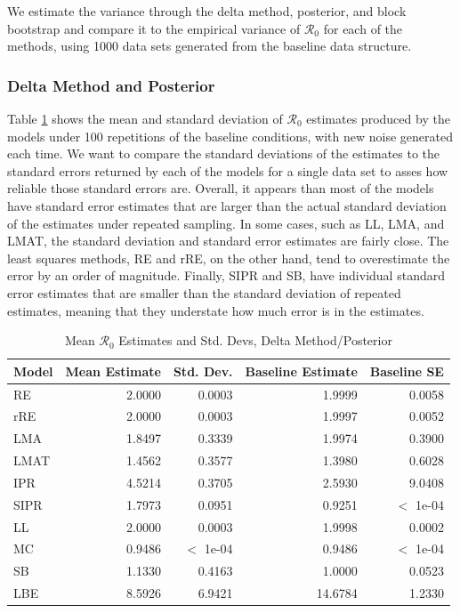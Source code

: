 \documentclass[12pt]{article}
\newcommand{\rr}{\ensuremath{\mathcal{R}_0}}
\begin{document}
We estimate the variance through the delta method, posterior, and  block bootstrap and compare it to the empirical variance of $\rr$ for each of the methods, using 1000 data sets generated from the baseline data structure.

\subsubsection{Delta Method and Posterior}

Table \ref{tab:rep-samp} shows the mean and standard deviation of $\rr$ estimates produced by the models under 100 repetitions of the baseline conditions, with new noise generated each time. We want to compare the standard deviations of the estimates to the standard errors returned by each of the models for a single data set to asses how reliable those standard errors are. Overall, it appears than most of the models have standard error estimates that are larger than the actual standard deviation of the estimates under repeated sampling. In some cases, such as LL, LMA, and LMAT, the standard deviation and standard error estimates are fairly close. The least squares methods, RE and rRE, on the other hand, tend to overestimate the error by an order of magnitude. Finally, SIPR and SB, have individual standard error estimates that are smaller than the standard deviation of repeated estimates, meaning that they understate how much error is in the estimates.


\begin{table}[H]
	
	\centering
	\begin{tabular}[t]{l|r|r|r|r}
		\hline
		Model & Mean Estimate & Std. Dev. & Baseline Estimate & Baseline SE\\
		\hline
		RE & 2.0000 & 0.0003 & 1.9999 & 0.0058\\
		\hline
		rRE & 2.0000 & 0.0003 & 1.9997 & 0.0052\\
		\hline
		LMA & 1.8497 & 0.3339 & 1.9974 & 0.3900\\
		\hline
		LMAT & 1.4562 & 0.3577 & 1.3980 & 0.6028 \\
		\hline
		IPR & 4.5214 & 0.3705 & 2.5930 & 9.0408\\
		\hline
		SIPR & 1.7973 & 0.0951 & 0.9251 & $<$ 1e-04 \\
		\hline
		LL & 2.0000 & 0.0003 & 1.9998 & 0.0002\\
		\hline
		MC & 0.9486 & $<$ 1e-04 & 0.9486 & $<$ 1e-04\\
		\hline
		SB & 1.1330 & 0.4163 & 1.0000 & 0.0523\\
		\hline
		LBE & 8.5926 & 6.9421 & 14.6784 & 1.2330\\
		\hline
	\end{tabular}
        \caption{Mean $\rr$ Estimates and Std. Devs, Delta Method/Posterior}
        \label{tab:rep-samp}
\end{table}
\end{document}
